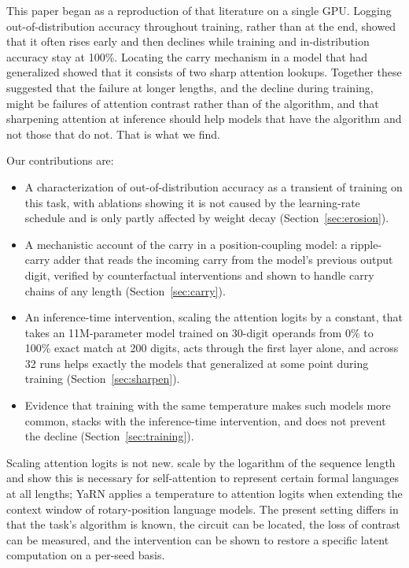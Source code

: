 \documentclass{article}
\begin{document}
This paper began as a reproduction of that literature on a single GPU. Logging out-of-distribution accuracy throughout training, rather than at the end, showed that it often rises early and then declines while training and in-distribution accuracy stay at 100\%. Locating the carry mechanism in a model that had generalized showed that it consists of two sharp attention lookups. Together these suggested that the failure at longer lengths, and the decline during training, might be failures of attention contrast rather than of the algorithm, and that sharpening attention at inference should help models that have the algorithm and not those that do not. That is what we find.

Our contributions are:
\begin{itemize}
  \item A characterization of out-of-distribution accuracy as a transient of training on this task, with ablations showing it is not caused by the learning-rate schedule and is only partly affected by weight decay (Section~\ref{sec:erosion}).
  \item A mechanistic account of the carry in a position-coupling model: a ripple-carry adder that reads the incoming carry from the model's previous output digit, verified by counterfactual interventions and shown to handle carry chains of any length (Section~\ref{sec:carry}).
  \item An inference-time intervention, scaling the attention logits by a constant, that takes an 11M-parameter model trained on 30-digit operands from 0\% to 100\% exact match at 200 digits, acts through the first layer alone, and across 32 runs helps exactly the models that generalized at some point during training (Section~\ref{sec:sharpen}).
  \item Evidence that training with the same temperature makes such models more common, stacks with the inference-time intervention, and does not prevent the decline (Section~\ref{sec:training}).
\end{itemize}

Scaling attention logits is not new. \citet{chiang2022overcoming} scale by the logarithm of the sequence length and show this is necessary for self-attention to represent certain formal languages at all lengths; YaRN \citep{peng2023yarn} applies a temperature to attention logits when extending the context window of rotary-position language models. The present setting differs in that the task's algorithm is known, the circuit can be located, the loss of contrast can be measured, and the intervention can be shown to restore a specific latent computation on a per-seed basis.
\end{document}
